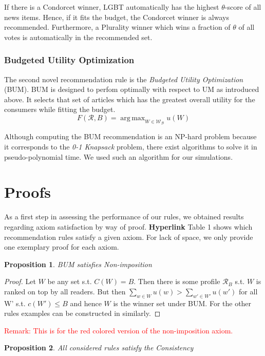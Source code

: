 \documentclass{article}
\DeclareMathOperator*{\argmax}{arg\,max}
\newtheorem{mytheorem}{Proposition}
\begin{document}
If there is a Condorcet winner, LGBT automatically has the highest $\theta$-score of all news items. Hence, if it fits the budget, the Condorcet winner is always recommended.
Furthermore, a Plurality winner which wins a fraction of $\theta$ of all votes is automatically in the recommended set.

\subsubsection{Budgeted Utility Optimization}
The second novel recommendation rule is the \emph{Budgeted Utility Optimization} (BUM). BUM is designed to perfom optimally with respect to UM as introduced above. It selects that set of articles which has the greatest overall utility for the consumers while fitting the budget.
\[
F(\mathcal{R},B)=\argmax_{W\in\mathcal{ W_B}} u(W)
\]

Although computing the BUM recommendation is an NP-hard problem because it corresponds to the {\em 0-1 Knapsack} problem, there exist algorithms to solve it in pseudo-polynomial time. We used such an algorithm for our simulations.
\section{Proofs}%
As a first step in assessing the performance of our rules, we obtained results regarding axiom satisfaction by way of proof. \textbf{Hyperlink} Table 1 shows which recommendation rules satisfy a given axiom. For lack of space, we only provide one exemplary proof for each axiom.

\begin{mytheorem}
BUM satisfies Non-imposition
\end{mytheorem}
\begin{proof}
Let $W$ be any set s.t. $C(W)=B$. Then there is some profile $\mathcal{R}_B$ s.t. $W$ is ranked on top by all readers. But then $\sum_{w\in W}u(w)>\sum_{w'\in W'}u(w')$ for all W' s.t. $c(W')\leq B$ and hence $W$ is the winner set under BUM. For the other rules examples can be constructed in similarly.
\end{proof}

\textcolor{red}{Remark: This is for the red colored version of the non-imposition axiom.}

\begin{mytheorem}
All considered rules satisfy the Consistency
\end{mytheorem}
\end{document}
